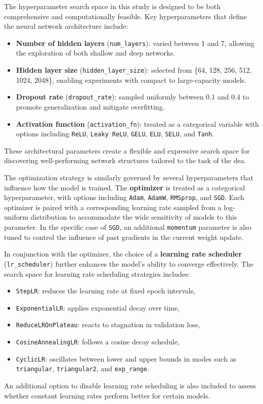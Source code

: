 The hyperparameter search space in this study is designed to be both comprehensive and computationally feasible.
Key hyperparameters that define the neural network architecture include:

\begin{itemize}
    \item \textbf{Number of hidden layers} (\texttt{num\_layers}): varied between 1 and 7, allowing the exploration of both shallow and deep networks.
    \item \textbf{Hidden layer size} (\texttt{hidden\_layer\_size}): selected from \{64, 128, 256, 512, 1024, 2048\}, enabling experiments with compact to large-capacity models.
    \item \textbf{Dropout rate} (\texttt{dropout\_rate}): sampled uniformly between 0.1 and 0.4 to promote generalization and mitigate overfitting.
    \item \textbf{Activation function} (\texttt{activation\_fn}): treated as a categorical variable with options including \texttt{ReLU}, \texttt{Leaky ReLU}, \texttt{GELU}, \texttt{ELU}, \texttt{SELU}, and \texttt{Tanh}.
\end{itemize}

These architectural parameters create a flexible and expressive search space for discovering well-performing network structures tailored to the task of the \ac{dea}.

The optimization strategy is similarly governed by several hyperparameters that influence how the model is trained.
The \textbf{optimizer} is treated as a categorical hyperparameter, with options including \texttt{Adam}, \texttt{AdamW}, \texttt{RMSprop}, and \texttt{SGD}.
Each optimizer is paired with a corresponding learning rate sampled from a log-uniform distribution to accommodate the wide sensitivity of models to this parameter.
In the specific case of \texttt{SGD}, an additional \texttt{momentum} parameter is also tuned to control the influence of past gradients in the current weight update.

In conjunction with the optimizer, the choice of a \textbf{learning rate scheduler} (\texttt{lr\_scheduler}) further enhances the model's ability to converge effectively.
The search space for learning rate scheduling strategies includes:
\begin{itemize}
    \item \texttt{StepLR}: reduces the learning rate at fixed epoch intervals,
    \item \texttt{ExponentialLR}: applies exponential decay over time,
    \item \texttt{ReduceLROnPlateau}: reacts to stagnation in validation loss,
    \item \texttt{CosineAnnealingLR}: follows a cosine decay schedule,
    \item \texttt{CyclicLR}: oscillates between lower and upper bounds in modes such as \texttt{triangular}, \texttt{triangular2}, and \texttt{exp\_range}.
\end{itemize}
An additional option to disable learning rate scheduling is also included to assess whether constant learning rates perform better for certain models.

